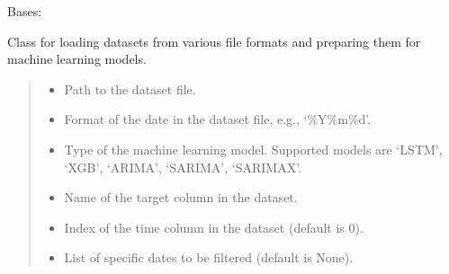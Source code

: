 \documentclass[letterpaper,10pt,english]{sphinxmanual}
\begin{document}
\begin{fulllineitems}
\label{\detokenize{docs/data_loader:data_loader.DataLoader}}
\pysigstartsignatures
{}
\pysigstopsignatures
\sphinxAtStartPar
Bases: 

\sphinxAtStartPar
Class for loading datasets from various file formats and preparing them for machine learning models.
\begin{quote}\begin{description}
\begin{itemize}
\item {} 
\sphinxAtStartPar
{} \textendash{} Path to the dataset file.

\item {} 
\sphinxAtStartPar
{} \textendash{} Format of the date in the dataset file, e.g., ‘\%Y\sphinxhyphen{}\%m\sphinxhyphen{}\%d’.

\item {} 
\sphinxAtStartPar
{} \textendash{} Type of the machine learning model. Supported models are ‘LSTM’, ‘XGB’, ‘ARIMA’, ‘SARIMA’, ‘SARIMAX’.

\item {} 
\sphinxAtStartPar
{} \textendash{} Name of the target column in the dataset.

\item {} 
\sphinxAtStartPar
{} \textendash{} Index of the time column in the dataset (default is 0).

\item {} 
\sphinxAtStartPar
{} \textendash{} List of specific dates to be filtered (default is None).


\end{itemize}
\end{description}
\end{quote}
\end{fulllineitems}
\end{document}
